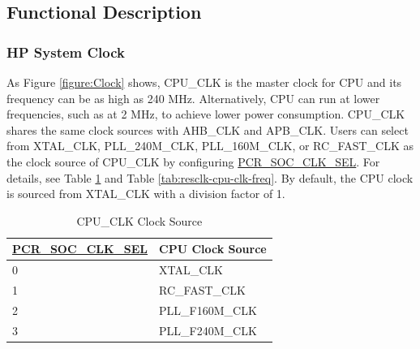 \documentclass[main\_\_EN.tex]{subfiles}
\begin{document}
\subsection{Functional Description}

\subsubsection{HP System Clock}

As Figure \ref{figure:Clock} shows, CPU\_CLK is the master clock for CPU and its frequency can be as high as 240 MHz. Alternatively, CPU can run at lower frequencies, such as at 2 MHz, to achieve lower power consumption. CPU\_CLK shares the same clock sources with AHB\_CLK and APB\_CLK. Users can select from XTAL\_CLK, PLL\_240M\_CLK, PLL\_160M\_CLK, or RC\_FAST\_CLK as the clock source of CPU\_CLK by configuring  \hyperref[fielddesc:PCRSOCCLKSEL]{PCR\_SOC\_CLK\_SEL}. For details, see Table  \ref{tab:resclk-cpu-clk-src} and Table \ref{tab:resclk-cpu-clk-freq}. By default, the CPU clock is sourced from XTAL\_CLK with a division factor of 1.

\begin{longtable}[c]{|p{5cm}|p{5cm}| }
       \caption{CPU\_CLK Clock Source}
		\label{tab:resclk-cpu-clk-src} \\
	    \hline
        \rowcolor{lightgray}
        \textbf{\hyperref[fielddesc:PCRSOCCLKSEL]{PCR\_SOC\_CLK\_SEL}} & \textbf{CPU Clock Source} \\
        \hline
        0 & XTAL\_CLK \\
        \hline
        1 & RC\_FAST\_CLK \\
        \hline
        2 & PLL\_F160M\_CLK \\
        \hline
        3 & PLL\_F240M\_CLK \\
        \hline
\end{longtable}
\end{document}
